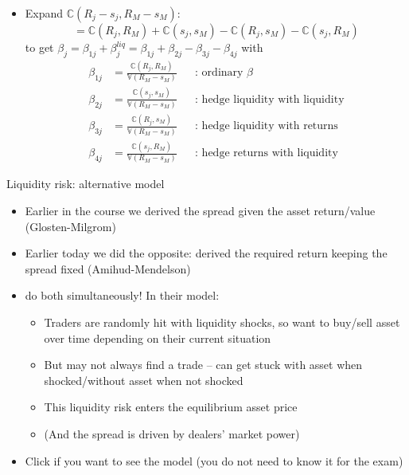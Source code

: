 \documentclass[english,10pt
,aspectratio=169
]{beamer}
\begin{document}
\begin{frame}{}
	\begin{itemize}
		\item Expand $\mathbb{C}(R_j-s_j, R_M-s_M)$:
		\[
		=\mathbb{C}(R_j, R_M)+\mathbb{C}(s_j, s_M)-\mathbb{C}(R_j, s_M)-\mathbb{C}(s_j, R_M)
		\]
		to get $\beta_j=\beta_{1j}+\beta^{liq}_j=\beta_{1j}+\beta_{2j}-\beta_{3j}-\beta_{4j}$ with
		\begin{align*}
		\beta_{1j} 	& = \frac{\mathbb{C}(R_j, R_M)}{\mathbb{V}(R_M-s_M)} 	&& \text{: ordinary $\beta$} \\
		\beta_{2j}	& = \frac{\mathbb{C}(s_j, s_M)}{\mathbb{V}(R_M-s_M)}	&& \text{: hedge liquidity with liquidity}\\
		\beta_{3j}	& = \frac{\mathbb{C}(R_j, s_M)}{\mathbb{V}(R_M-s_M)} 	&& \text{: hedge liquidity with returns} \\
		\beta_{4j}	& = \frac{\mathbb{C}(s_j, R_M)}{\mathbb{V}(R_M-s_M)}	&& \text{: hedge returns with liquidity}
		\end{align*}
	\end{itemize}
\end{frame}




\begin{frame}{Liquidity risk: alternative model}
	\begin{itemize}
		\item Earlier in the course we derived the spread given the asset return/value (Glosten-Milgrom)
		\item Earlier today we did the opposite: derived the required return keeping the spread fixed (Amihud-Mendelson)
		\item \citet*{duffie_over--counter_2005,duffie_valuation_2007} do both simultaneously! In their model:
		\begin{itemize}
			\item Traders are randomly hit with liquidity shocks, so want to buy/sell asset over time depending on their current situation
			\item But may not always find a trade -- can get stuck with asset when shocked/without asset when not shocked
			\item This liquidity risk enters the equilibrium asset price
			\item (And the spread is driven by dealers' market power)
		\end{itemize}
		\item Click \hyperlink{slide:DGP}{} if you want to see the model (you do not need to know it for the exam)
	\end{itemize}
\end{frame}
\end{document}
